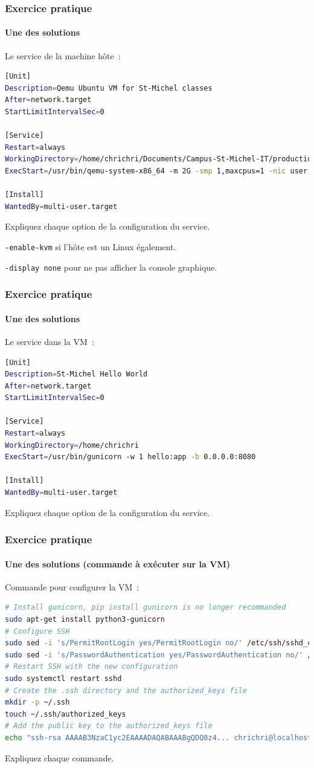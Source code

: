 \documentclass{beamer}
\begin{document}
    \begin{frame}[fragile]
        \transdissolve
        \frametitle{Exercice pratique}
        \framesubtitle{Une des solutions}
        Le service de la machine hôte~:
        \begin{lstlisting}[language=bash]
[Unit]
Description=Qemu Ubuntu VM for St-Michel classes
After=network.target
StartLimitIntervalSec=0

[Service]
Restart=always
WorkingDirectory=/home/chrichri/Documents/Campus-St-Michel-IT/production-deployment
ExecStart=/usr/bin/qemu-system-x86_64 -m 2G -smp 1,maxcpus=1 -nic user,hostfwd=tcp::5022-:22,hostfwd=tcp::5080-:8080 -display none -hda linux.qcow2 -k fr -enable-kvm

[Install]
WantedBy=multi-user.target
        \end{lstlisting}
        Expliquez chaque option de la configuration du service.
        \pause
        \begin{dangercolorbox}
            \lstinline{-enable-kvm} si l'hôte est un Linux également.

            \lstinline{-display none} pour ne pas afficher la console graphique.
        \end{dangercolorbox}
    \end{frame}

    \begin{frame}[fragile]
        \transdissolve
        \frametitle{Exercice pratique}
        \framesubtitle{Une des solutions}
        Le service dans la VM~:
        \begin{lstlisting}[language=bash]
[Unit]
Description=St-Michel Hello World
After=network.target
StartLimitIntervalSec=0

[Service]
Restart=always
WorkingDirectory=/home/chrichri
ExecStart=/usr/bin/gunicorn -w 1 hello:app -b 0.0.0.0:8080

[Install]
WantedBy=multi-user.target
        \end{lstlisting}
        Expliquez chaque option de la configuration du service.
    \end{frame}

    \begin{frame}[fragile]
        \transdissolve
        \frametitle{Exercice pratique}
        \framesubtitle{Une des solutions (commande à exécuter sur la VM)}
        Commande pour configurer la VM~:
        \begin{lstlisting}[language=bash]
# Install gunicorn, pip install gunicorn is no longer recommanded
sudo apt-get install python3-gunicorn
# Configure SSH
sudo sed -i 's/PermitRootLogin yes/PermitRootLogin no/' /etc/ssh/sshd_config
sudo sed -i 's/PasswordAuthentication yes/PasswordAuthentication no/' /etc/ssh/sshd_config
# Restart SSH with the new configuration
sudo systemctl restart sshd
# Create the .ssh directory and the authorized_keys file
mkdir -p ~/.ssh
touch ~/.ssh/authorized_keys
# Add the public key to the authorized_keys file
echo "ssh-rsa AAAAB3NzaC1yc2EAAAADAQABAAABgQDQ8z4... chrichri@localhost" >> ~/.ssh/authorized_keys
        \end{lstlisting}
        Expliquez chaque commande.
    \end{frame}
\end{document}
